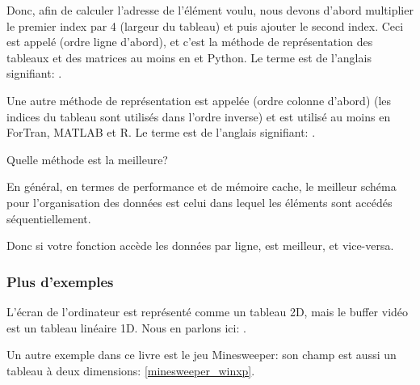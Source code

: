 
Donc, afin de calculer l'adresse de l'élément voulu, nous devons d'abord multiplier
le premier index par 4 (largeur du tableau) et puis ajouter le second index.
Ceci est appelé  (ordre ligne d'abord),
et c'est la méthode de représentation des tableaux et des matrices au moins en \CCpp
et Python.
Le terme  est de l'anglais signifiant: .

Une autre méthode de représentation est appelée  (ordre colonne
d'abord) (les indices du tableau sont utilisés dans l'ordre inverse) et est utilisé
au moins en ForTran, MATLAB et R.
Le terme  est de l'anglais signifiant: .

Quelle méthode est la meilleure?

En général, en termes de performance et de mémoire cache, le meilleur schéma pour
l'organisation des données est celui dans lequel les éléments sont accédés séquentiellement.

Donc si votre fonction accède les données par ligne,  est meilleur,
et vice-versa.





\subsubsection{Plus d'exemples}

L'écran de l'ordinateur est représenté comme un tableau 2D, mais le buffer vidéo
est un tableau linéaire 1D.
Nous en parlons ici: .

Un autre exemple dans ce livre est le jeu Minesweeper: son champ est aussi un tableau
à deux dimensions: \ref{minesweeper_winxp}.

